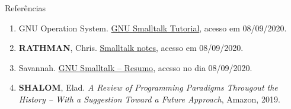 \begin{frame}[fragile]{Referências}

    \begin{enumerate}
        \item GNU Operation System. \href{https://www.gnu.org/software/smalltalk/manual/gst.html#Tutorial}{GNU Smalltalk Tutorial}, acesso em 08/09/2020.
 
        \item \textbf{RATHMAN}, Chris. \href{http://www.angelfire.com/tx4/cus/notes/smalltalk.html}{Smalltalk notes}, acesso em 08/09/2020.
 
        \item Savannah. \href{https://savannah.gnu.org/projects/smalltalk}{GNU Smalltalk -- Resumo},
            acesso no dia 08/09/2020.

        \item \textbf{SHALOM}, Elad. \textit{A Review of Programming Paradigms Througout the 
            History -- With a Suggestion Toward a Future Approach}, Amazon, 2019.
    \end{enumerate}

\end{frame}
